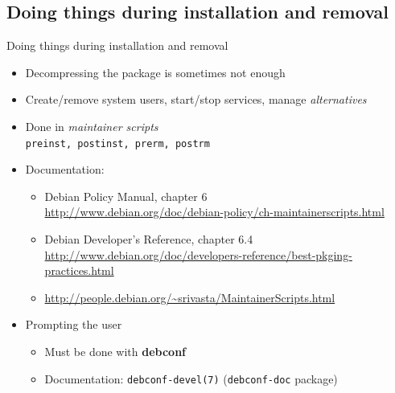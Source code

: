\documentclass[10pt,final]{beamer}
\begin{document}
\subsection{Doing things during installation and removal}
\begin{frame}{Doing things during installation and removal}
  \begin{itemize}
  \item Decompressing the package is sometimes not enough
    \hbr
  \item Create/remove system users, start/stop services, manage \textsl{alternatives}
    \hbr
  \item Done in \textsl{maintainer scripts}\\
    \texttt{preinst, postinst, prerm, postrm}
    \hbr
  \item Documentation:
    \begin{itemize}
    \item Debian Policy Manual, chapter 6\\
      {\footnotesize \url{http://www.debian.org/doc/debian-policy/ch-maintainerscripts.html}}
      
      \hbr
    \item Debian Developer's Reference, chapter 6.4\\
      {\scriptsize \url{http://www.debian.org/doc/developers-reference/best-pkging-practices.html}}
      \hbr
    \item {\footnotesize \url{http://people.debian.org/~srivasta/MaintainerScripts.html}}
    \end{itemize}
    \br
  \item Prompting the user
    \begin{itemize}
    \item Must be done with \textbf{debconf}
      \hbr
    \item Documentation: \texttt{debconf-devel(7)} (\texttt{debconf-doc} package)
    \end{itemize}
  \end{itemize}
\end{frame}
\end{document}
